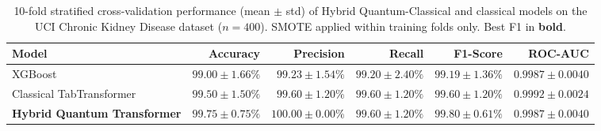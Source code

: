 \begin{table}[htbp]
  \centering
  \caption{10-fold stratified cross-validation performance (mean $\pm$ std) of
            Hybrid Quantum-Classical and classical models on the UCI Chronic
            Kidney Disease dataset ($n=400$). SMOTE applied within training folds
            only. Best F1 in \textbf{bold}.}
  \label{tab:ckd_cv_results}
  \begin{tabular}{lrrrrr}
    \toprule
    \textbf{Model} & \textbf{Accuracy} & \textbf{Precision} & \textbf{Recall} & \textbf{F1-Score} & \textbf{ROC-AUC} \\
    \midrule
    XGBoost & $99.00 \pm 1.66\%$ & $99.23 \pm 1.54\%$ & $99.20 \pm 2.40\%$ & $99.19 \pm 1.36\%$ & $0.9987 \pm 0.0040$ \\
        Classical TabTransformer & $99.50 \pm 1.50\%$ & $99.60 \pm 1.20\%$ & $99.60 \pm 1.20\%$ & $99.60 \pm 1.20\%$ & $0.9992 \pm 0.0024$ \\
        \textbf{Hybrid Quantum Transformer} & \textbf{$99.75 \pm 0.75\%$} & \textbf{$100.00 \pm 0.00\%$} & \textbf{$99.60 \pm 1.20\%$} & \textbf{$99.80 \pm 0.61\%$} & \textbf{$0.9987 \pm 0.0040$} \\
    \bottomrule
  \end{tabular}
\end{table}